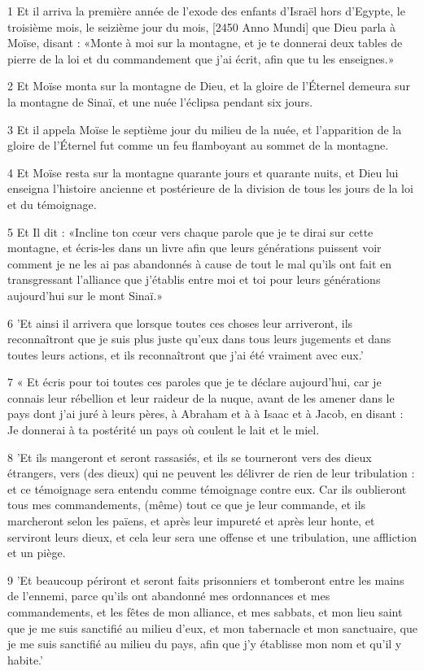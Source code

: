 \par 1 Et il arriva la première année de l'exode des enfants d'Israël hors d'Egypte, le troisième mois, le seizième jour du mois, [2450 Anno Mundi] que Dieu parla à Moïse, disant : «Monte à moi sur la montagne, et je te donnerai deux tables de pierre de la loi et du commandement que j'ai écrit, afin que tu les enseignes.»
\par 2 Et Moïse monta sur la montagne de Dieu, et la gloire de l'Éternel demeura sur la montagne de Sinaï, et une nuée l'éclipsa pendant six jours.
\par 3 Et il appela Moïse le septième jour du milieu de la nuée, et l'apparition de la gloire de l'Éternel fut comme un feu flamboyant au sommet de la montagne.
\par 4 Et Moïse resta sur la montagne quarante jours et quarante nuits, et Dieu lui enseigna l'histoire ancienne et postérieure de la division de tous les jours de la loi et du témoignage.
\par 5 Et Il dit : «Incline ton cœur vers chaque parole que je te dirai sur cette montagne, et écris-les dans un livre afin que leurs générations puissent voir comment je ne les ai pas abandonnés à cause de tout le mal qu'ils ont fait en transgressant l'alliance que j'établis entre moi et toi pour leurs générations aujourd'hui sur le mont Sinaï.»
\par 6 'Et ainsi il arrivera que lorsque toutes ces choses leur arriveront, ils reconnaîtront que je suis plus juste qu'eux dans tous leurs jugements et dans toutes leurs actions, et ils reconnaîtront que j'ai été vraiment avec eux.'
\par 7 « Et écris pour toi toutes ces paroles que je te déclare aujourd'hui, car je connais leur rébellion et leur raideur de la nuque, avant de les amener dans le pays dont j'ai juré à leurs pères, à Abraham et à à Isaac et à Jacob, en disant : Je donnerai à ta postérité un pays où coulent le lait et le miel.
\par 8 'Et ils mangeront et seront rassasiés, et ils se tourneront vers des dieux étrangers, vers (des dieux) qui ne peuvent les délivrer de rien de leur tribulation : et ce témoignage sera entendu comme témoignage contre eux. Car ils oublieront tous mes commandements, (même) tout ce que je leur commande, et ils marcheront selon les païens, et après leur impureté et après leur honte, et serviront leurs dieux, et cela leur sera une offense et une tribulation, une affliction et un piège.
\par 9 'Et beaucoup périront et seront faits prisonniers et tomberont entre les mains de l'ennemi, parce qu'ils ont abandonné mes ordonnances et mes commandements, et les fêtes de mon alliance, et mes sabbats, et mon lieu saint que je me suis sanctifié au milieu d'eux, et mon tabernacle et mon sanctuaire, que je me suis sanctifié au milieu du pays, afin que j'y établisse mon nom et qu'il y habite.'
